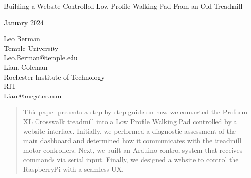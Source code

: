 \documentclass[journal]{IEEEtran}
\begin{document}
\begin{title}{Building a Website Controlled Low Profile Walking Pad From an Old Treadmill\\
    \begin{center}    
        {\large January 2024}
    \end{center}}
\end{title}

\maketitle

\begin{center}
Leo Berman\\
Temple University\\
Leo.Berman@temple.edu\\
{\bigskip}
Liam Coleman\\
Rochester Institute of Technology\\
RIT\\
Liam@megster.com\\
\end{center}
\begin{abstract}
This paper presents a step-by-step guide on how we converted the Proform XL Crosswalk treadmill into a Low Profile Walking Pad controlled by a website interface. Initially, we performed a diagnostic assessment of the main dashboard and determined how it communicates with the treadmill motor controllers. Next, we built an Arduino control system that receives commands via serial input. Finally, we designed a website to control the RaspberryPi with a seamless UX.
\end{abstract}
\IEEEpeerreviewmaketitle
\end{document}
